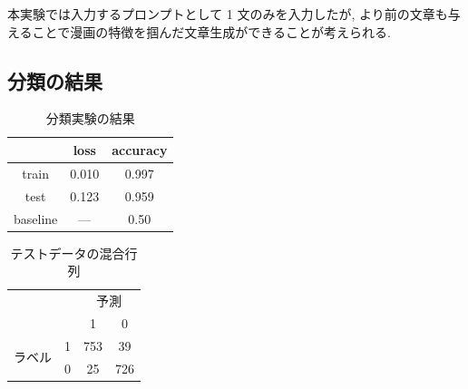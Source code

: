 \documentclass[twocolumn]{jarticle}     %
\begin{document}
本実験では入力するプロンプトとして 1 文のみを入力したが, より前の文章も与えることで漫画の特徴を掴んだ文章生成ができることが考えられる.




\subsection{分類の結果}

\begin{table}[tb]
  \begin{center}
    \caption{分類実験の結果}
    \begin{tabular}{ccc}
      \hline
       & loss & accuracy \\
      \hline
      train & 0.010 & 0.997 \\
      test & 0.123 & 0.959 \\
      baseline & --- & 0.50 \\
      \hline
    \end{tabular}
    \label{tab:result}
  \end{center}
\end{table}

\begin{table}[tb]
  \begin{center}
    \caption{テストデータの混合行列}
    \begin{tabular}{|c|c|c|c|}
    \hline
    \multicolumn{2}{|c|}{\multirow{2}{*}{\textbf{}}} & \multicolumn{2}{c|}{予測} \\ \cline{3-4}
    \multicolumn{2}{|c|}{}                           & 1               & 0              \\ \hline
    \multirow{2}{*}{ラベル}              & 1             & 753              & 39              \\ \cline{2-4}
                                     & 0             & 25              & 726             \\ \hline
    \end{tabular}
    \label{tab:conmat}
  \end{center}
\end{table}
\end{document}

